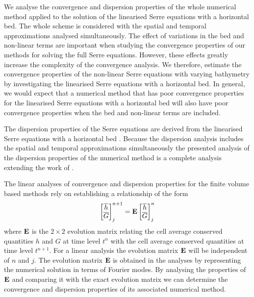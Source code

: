 We analyse the convergence and dispersion properties of the whole numerical method applied to the solution of the linearised Serre equations with a horizontal bed. The whole scheme is considered with the spatial and temporal approximations analysed simultaneously. The effect of variations in the bed and non-linear terms are important when studying the convergence properties of our methods for solving the full Serre equations. However, these effects greatly increase the complexity of the convergence analysis. We therefore, estimate the convergence properties of the non-linear Serre equations with varying bathymetry by investigating the linearised Serre equations with a horizontal bed. In general, we would expect that a numerical method that has poor convergence properties for the linearised Serre equations with a horizontal bed will also have poor convergence properties when the bed and non-linear terms are included. 

The dispersion properties of the Serre equations are derived from the linearised Serre equations with a horizontal bed \cite{Zoppou-etal-2017}. Because the dispersion analysis includes the spatial and temporal approximations simultaneously the presented analysis of the dispersion properties of the numerical method is a complete analysis extending the work of \citet{Filippini-etal-2016-381}.

The linear analyses of convergence and dispersion properties for the finite volume based methods rely on establishing a relationship of the form
\begin{equation}
\label{eqn:linearanalaim}
\begin{bmatrix}
\overline{h} \\\overline{G} 
\end{bmatrix}^{n+1}_j = \mathbf{E} \begin{bmatrix}
\overline{h} \\\overline{G}
\end{bmatrix}^{n}_j
\end{equation}
where $\mathbf{E}$ is the $2 \times 2$ evolution matrix relating the cell average conserved quantities $h$ and $G$ at time level $t^n$ with the cell average conserved quantities at time level $t^{n+1}$. For a linear analysis the evolution matrix $\mathbf{E}$ will be independent of $n$ and $j$. The evolution matrix $\mathbf{E}$ is obtained in the analyses by representing the numerical solution in terms of Fourier modes. By analysing the properties of $\mathbf{E}$ and comparing it with the exact evolution matrix we can determine the convergence and dispersion properties of its associated numerical method.
 
